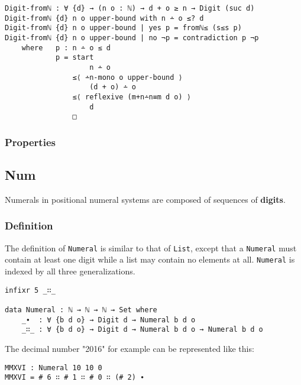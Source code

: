 \documentclass[12pt, a4paper]{article}
\begin{document}
\begin{lstlisting}
Digit-fromℕ : ∀ {d} → (n o : ℕ) → d + o ≥ n → Digit (suc d)
Digit-fromℕ {d} n o upper-bound with n ∸ o ≤? d
Digit-fromℕ {d} n o upper-bound | yes p = fromℕ≤ (s≤s p)
Digit-fromℕ {d} n o upper-bound | no ¬p = contradiction p ¬p
    where   p : n ∸ o ≤ d
            p = start
                    n ∸ o
                ≤⟨ ∸n-mono o upper-bound ⟩
                    (d + o) ∸ o
                ≤⟨ reflexive (m+n∸n≡m d o) ⟩
                    d
                □
\end{lstlisting}

\subsubsection{Properties}

%
%

\subsection{Num}

Numerals in positional numeral systems are composed of sequences of \textbf{digits}.

\subsubsection{Definition}
The definition of {\lstinline|Numeral|} is similar to that of {\lstinline|List|},
except that a {\lstinline|Numeral|} must contain at least one digit while a list
may contain no elements at all. {\lstinline|Numeral|} is indexed by all three
generalizations.

\begin{lstlisting}
infixr 5 _∷_

data Numeral : ℕ → ℕ → ℕ → Set where
    _∙  : ∀ {b d o} → Digit d → Numeral b d o
    _∷_ : ∀ {b d o} → Digit d → Numeral b d o → Numeral b d o
\end{lstlisting}

The decimal number "2016" for example can be represented like this:

\begin{lstlisting}
MMXVI : Numeral 10 10 0
MMXVI = # 6 ∷ # 1 ∷ # 0 ∷ (# 2) ∙
\end{lstlisting}
\end{document}
